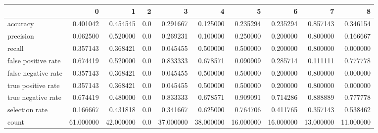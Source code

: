 \begin{tabular}{lrrrrrrrrr}
\toprule
{} &          0 &          1 &    2 &          3 &          4 &          5 &          6 &          7 &          8 \\
\midrule
accuracy            &   0.401042 &   0.454545 &  0.0 &   0.291667 &   0.125000 &   0.235294 &   0.235294 &   0.857143 &   0.346154 \\
precision           &   0.062500 &   0.520000 &  0.0 &   0.269231 &   0.100000 &   0.250000 &   0.200000 &   0.800000 &   0.166667 \\
recall              &   0.357143 &   0.368421 &  0.0 &   0.045455 &   0.500000 &   0.500000 &   0.200000 &   0.800000 &   0.000000 \\
false positive rate &   0.674419 &   0.520000 &  0.0 &   0.833333 &   0.678571 &   0.090909 &   0.285714 &   0.111111 &   0.777778 \\
false negative rate &   0.357143 &   0.368421 &  0.0 &   0.045455 &   0.500000 &   0.500000 &   0.200000 &   0.800000 &   0.000000 \\
true positive rate  &   0.357143 &   0.368421 &  0.0 &   0.045455 &   0.500000 &   0.500000 &   0.200000 &   0.800000 &   0.000000 \\
true negative rate  &   0.674419 &   0.480000 &  0.0 &   0.833333 &   0.678571 &   0.909091 &   0.714286 &   0.888889 &   0.777778 \\
selection rate      &   0.166667 &   0.431818 &  0.0 &   0.341667 &   0.625000 &   0.764706 &   0.411765 &   0.357143 &   0.538462 \\
count               &  61.000000 &  42.000000 &  0.0 &  37.000000 &  38.000000 &  16.000000 &  16.000000 &  13.000000 &  11.000000 \\
\bottomrule
\end{tabular}
